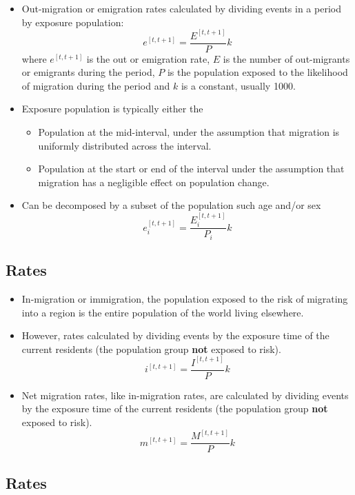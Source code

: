 \documentclass[
]{book}
\providecommand{\tightlist}{%
  \setlength{\itemsep}{0pt}\setlength{\parskip}{0pt}}
\begin{document}
\begin{itemize}
\tightlist
\item
  Out-migration or emigration rates calculated by dividing events in a period by exposure population:
  \[
  e^{[t, t +1]} = \frac{E^{[t, t +1]}}{P}k
  \]
  where \(e^{[t, t +1]}\) is the out or emigration rate, \(E\) is the number of out-migrants or emigrants during the period, \(P\) is the population exposed to the likelihood of migration during the period and \(k\) is a constant, usually 1000.
\item
  Exposure population is typically either the

  \begin{itemize}
  \tightlist
  \item
    Population at the mid-interval, under the assumption that migration is uniformly distributed across the interval.
  \item
    Population at the start or end of the interval under the assumption that migration has a negligible effect on population change.
  \end{itemize}
\item
  Can be decomposed by a subset of the population such age and/or sex\\
  \[
  e^{[t, t +1]}_{i} = \frac{E_{i}^{[t, t +1]}}{P_{i}}k
  \]
\end{itemize}

\hypertarget{rates}{%
\subsection{Rates}\label{rates}}

\begin{itemize}
\item
  In-migration or immigration, the population exposed to the risk of migrating into a region is the entire population of the world living elsewhere.
\item
  However, rates calculated by dividing events by the exposure time of the current residents (the population group \textbf{not} exposed to risk).
  \[
  i^{[t, t +1]} = \frac{I^{[t, t +1]}}{P}k
  \]
\item
  Net migration rates, like in-migration rates, are calculated by dividing events by the exposure time of the current residents (the population group \textbf{not} exposed to risk).
  \[
  m^{[t, t +1]} = \frac{M^{[t, t +1]}}{P}k
  \]
\end{itemize}

\hypertarget{rates-1}{%
\subsection{Rates}\label{rates-1}}
\end{document}
